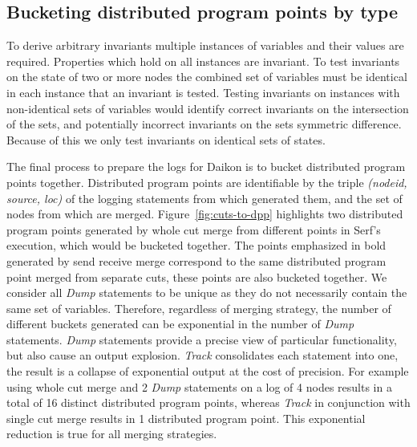 \subsection{Bucketing distributed program points by type}


To derive arbitrary invariants multiple instances of variables and
their values are required. Properties which hold on all instances are
invariant. To test invariants on the state of two or more nodes the
combined set of variables must be identical in each instance that an
invariant is tested. Testing invariants on instances with
non-identical sets of variables would identify correct invariants on
the intersection of the sets, and potentially incorrect invariants on
the sets symmetric difference.  Because of this we only test
invariants on identical sets of states.

The final process to prepare the logs for Daikon is to bucket
distributed program points together.  Distributed program points are
identifiable by the triple \emph{(nodeid, source, loc)} of the logging
statements from which generated them, and the set of nodes from which
are merged.  Figure~\ref{fig:cuts-to-dpp} highlights two distributed
program points generated by whole cut merge from different points in
Serf's execution, which would be bucketed together.  The points
emphasized in bold generated by send receive merge correspond to the
same distributed program point merged from separate cuts, these points
are also bucketed together.  We consider all \textit{Dump} statements to be
unique as they do not necessarily contain the same set of
variables. Therefore, regardless of merging strategy, the number of
different buckets generated can be exponential in the number of
\textit{Dump} statements. \textit{Dump} statements provide a precise
view of particular functionality, but also cause an output explosion.
%
%
\textit{Track} consolidates each statement into one, the result is a
collapse of exponential output at the cost of precision.  For example
using whole cut merge and 2 \textit{Dump} statements on a log of 4
nodes results in a total of 16 distinct distributed program points,
whereas \textit{Track} in conjunction with single cut merge results in
1 distributed program point. This exponential reduction is true for
all merging strategies.
%
%

